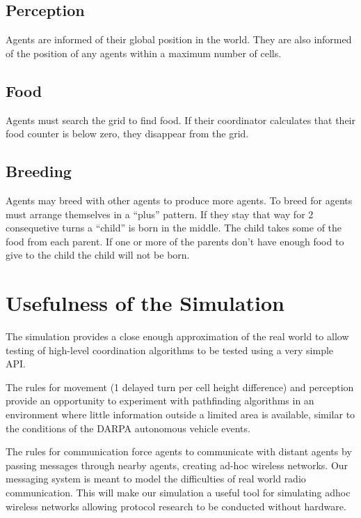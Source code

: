 \subsection{Perception}

Agents are informed of their global position in the world. They are also informed of the position of any agents within a maximum number of cells.

\subsection{Food}

Agents must search the grid to find food. If their coordinator calculates that their food counter is below zero, they disappear from the grid.

\subsection{Breeding}

Agents may breed with other agents to produce more agents. To breed for agents must arrange themselves in a ``plus'' pattern. If they stay that way for 2 consequetive turns a ``child'' is born in the middle. The child takes some of the food from each parent. If one or more of the parents don't have enough food to give to the child the child will not be born.

\section{Usefulness of the Simulation}

The simulation provides a close enough approximation of the real world to allow testing of high-level coordination algorithms to be tested using a very simple API.

The rules for movement (1 delayed turn per cell height difference) and perception provide an opportunity to experiment with pathfinding algorithms in an environment where little information outside a limited area is available, similar to the conditions of the DARPA autonomous vehicle events.

The rules for communication force agents to communicate with distant agents by passing messages through nearby agents, creating ad-hoc wireless networks. Our messaging system is meant to model the difficulties of real world radio communication. This will make our simulation a useful tool for simulating adhoc wireless networks allowing protocol research to be conducted without hardware.
